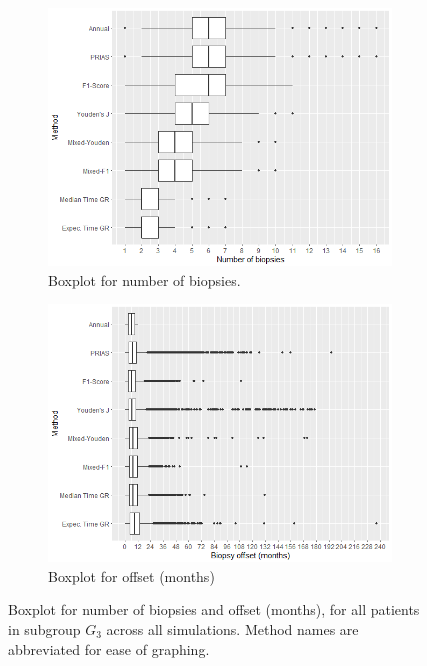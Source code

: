 \begin{figure}[!htb]
    \centering
    \captionsetup{justification=centering}
     \begin{subfigure}[b]{0.45\textwidth}
        \includegraphics[width=\textwidth]{images/sim_study/nbBoxPlot_scale_6.png}
        \caption{Boxplot for number of biopsies.}
        \label{fig : nbBoxPlot_G3}
    \end{subfigure}
    \begin{subfigure}[b]{0.45\textwidth}
        \includegraphics[width=\textwidth]{images/sim_study/offsetBoxPlot_scale_6.png}
        \caption{Boxplot for offset (months)}
        \label{fig : offsetBoxPlot_G3}
    \end{subfigure}      
    \caption{Boxplot for number of biopsies and offset (months), for all patients in subgroup $G_3$ across all simulations. Method names are abbreviated for ease of graphing.}
     \label{fig : nbAndOffsetBoxPlot_G3}
\end{figure}

